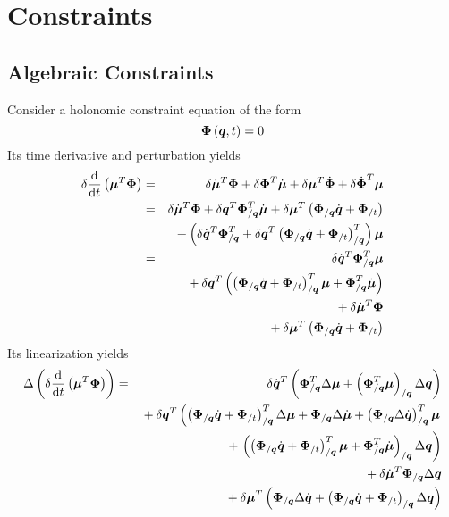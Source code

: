 \documentclass[10pt,dvips]{report}
\newcommand{\T}[1]{\boldsymbol{#1}}
\begin{document}
\chapter{Constraints}

\section{Algebraic Constraints}
Consider a holonomic constraint equation of the form
\begin{equation*}
	\T{\Phi}\plbr{\T{q}, t} = 0 
\end{equation*}
Its time derivative and perturbation yields
\begin{eqnarray*}
	\delta\frac{\llk{d}}{\llk{d}t}\plbr{\T{\mu}^T\T{\Phi}} & = &
		\delta\dot{\T{\mu}}^T \T{\Phi}
		+ \delta\T{\Phi}^T \dot{\T{\mu}}
		+ \delta\T{\mu}^T \dot{\T{\Phi}}
		+ \delta\dot{\T{\Phi}}^T \T{\mu} \\
	& = & \delta\dot{\T{\mu}}^T \T{\Phi}
		+ \delta\T{q}^T \T{\Phi}_{/\T{q}}^T \dot{\T{\mu}}
		+ \delta\T{\mu}^T\plbr{
			\T{\Phi}_{/\T{q}} \dot{\T{q}}
			+ \T{\Phi}_{/t}
		} \\
	& & \mbox{} + \plbr{
			\delta\dot{\T{q}}^T \T{\Phi}_{/\T{q}}^T
			+ \delta\T{q}^T \plbr{
				\T{\Phi}_{/\T{q}} \dot{\T{q}}
				+ \T{\Phi}_{/t}
			}_{/\T{q}}^T
		} \T{\mu} \\
	& = & \delta\dot{\T{q}}^T \T{\Phi}_{/\T{q}}^T \T{\mu} \\
	& & \mbox{} + \delta\T{q}^T \plbr{
		\plbr{
			\T{\Phi}_{/\T{q}} \dot{\T{q}}
			+ \T{\Phi}_{/t}
		}_{/\T{q}}^T \T{\mu}
		+ \T{\Phi}_{/\T{q}}^T \dot{\T{\mu}}
	} \\
	& & \mbox{} + \delta\dot{\T{\mu}}^T \T{\Phi} \\
	& & \mbox{} + \delta\T{\mu}^T \plbr{
		\T{\Phi}_{/\T{q}} \dot{\T{q}}
		+ \T{\Phi}_{/t}
	}
\end{eqnarray*}
Its linearization yields
\begin{eqnarray*}
	\Delta\plbr{\delta\frac{\llk{d}}{\llk{d}t}\plbr{\T{\mu}^T\T{\Phi}}}
	& = & \delta\dot{\T{q}}^T \plbr{
		\T{\Phi}_{/\T{q}}^T \Delta\T{\mu}
		+ \plbr{\T{\Phi}_{/\T{q}}^T \T{\mu}}_{/\T{q}} \Delta\T{q}
	} \\
	& & \mbox{} + \delta\T{q}^T \lplbr{
		\plbr{
			\T{\Phi}_{/\T{q}} \dot{\T{q}}
			+ \T{\Phi}_{/t}
		}_{/\T{q}}^T \Delta \T{\mu}
		+ \T{\Phi}_{/\T{q}} \Delta\dot{\T{\mu}}
		+ \plbr{\T{\Phi}_{/\T{q}} \Delta\dot{\T{q}}}_{/\T{q}}^T \T{\mu}
	} \\
	& & \mbox{\hspace{12mm}} + \rplbr{
		\plbr{
			\plbr{
				\T{\Phi}_{/\T{q}} \dot{\T{q}}
				+ \T{\Phi}_{/t}
			}_{/\T{q}}^T \T{\mu}
			+ \T{\Phi}_{/\T{q}}^T \dot{\T{\mu}}
		}_{/\T{q}} \Delta\T{q}
	} \\
	& & \mbox{} + \delta\dot{\T{\mu}}^T \T{\Phi}_{/\T{q}} \Delta\T{q} \\
	& & \mbox{} + \delta\T{\mu}^T \plbr{
		\T{\Phi}_{/\T{q}} \Delta\dot{\T{q}}
		+ \plbr{
			\T{\Phi}_{/\T{q}} \dot{\T{q}}
			+ \T{\Phi}_{/t}
		}_{/\T{q}} \Delta\T{q}
	}
\end{eqnarray*}
\end{document}
